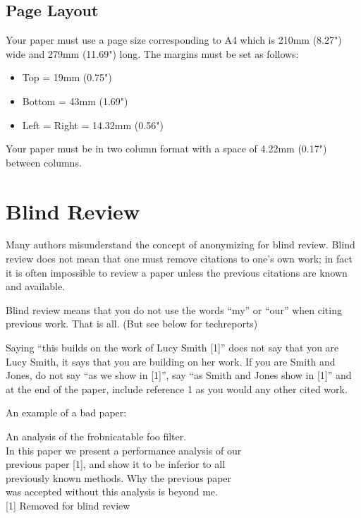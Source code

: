 \documentclass[10pt,conference,a4paper]{IEEEtran}
\begin{document}
\subsection{Page Layout}

Your paper must use a page size corresponding to A4 which is
210mm (8.27") wide and 279mm (11.69") long.  The margins must be
set as follows:

\begin{itemize}
\item	Top = 19mm (0.75")
\item	Bottom = 43mm (1.69")
\item	Left = Right = 14.32mm (0.56")
\end{itemize}

Your paper must be in two column format with a space of 4.22mm
(0.17") between columns.

\section{Blind Review}

Many authors misunderstand the concept of anonymizing for blind review. 
Blind review does not mean that one must remove citations to one's own work;
in fact it is often impossible to review a paper unless the previous citations are 
known and available.

Blind review means that you do not use the words ``my'' or ``our'' when citing 
previous work. That is all. (But see below for techreports)

Saying ``this builds on the work of Lucy Smith [1]'' does not say that you are Lucy 
Smith, it says that you are building on her work. If you are Smith and Jones, do 
not say ``as we show in [1]'', say ``as Smith and Jones show in [1]'' and at the end 
of the paper, include reference 1 as you would any other cited work.

An example of a bad paper:
\begin{flushleft}
\setlength{\leftskip}{.15in}
\hspace{.5in} An analysis of the frobnicatable foo filter.\\
In this paper we present a performance analysis of our \\
previous paper [1], and show it to be inferior to all \\
previously known methods. Why the previous paper \\
was accepted without this analysis is beyond me.\\

[1] Removed for blind review\\
\setlength{\leftskip}{0in}
\end{flushleft}
\end{document}
